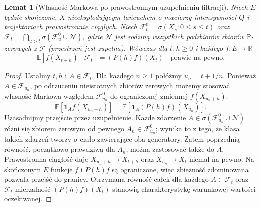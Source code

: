 \documentclass[11pt,a4paper,oneside]{report}
\numberwithin{equation}{chapter}
\theoremstyle{plain}
\newtheorem{lemat}[twierdzenie]{Lemat}
\theoremstyle{definition}
\theoremstyle{remark}
\newcommand{\R}{\mathbb{R}}
\newcommand{\Prob}{\mathbb{P}}
\newcommand{\E}{\mathbb{E}}
\newcommand{\calF}{\mathcal{F}}
\newcommand{\calN}{\mathcal{N}}
\newcommand{\ind}[1]{\mathbf{1}_{#1}}
\begin{document}
\begin{lemat}[Własność Markowa po prawostronnym uzupełnieniu filtracji]
\label{lem:markov-aug}
Niech $E$ będzie skończone, $X$ nieeksplodującym łańcuchem
o macierzy intensywności $Q$ i trajektoriach prawostronnie
ciągłych. Niech $\calF_t^0=\sigma(X_s:0\le s\le t)$
oraz
$\calF_t=\bigcap_{u>t}\sigma(\calF_u^0\cup\calN)$,
gdzie $\calN$ jest rodziną wszystkich podzbiorów zbiorów
$\Prob$-zerowych z $\calF$ (przestrzeń jest zupełna).
Wówczas dla $t,h\ge0$ i każdego $f:E\to\R$
\[
\E[f(X_{t+h})\mid\calF_t]=(P(h)f)(X_t)
\quad\text{prawie na pewno}.
\]
\end{lemat}
\begin{proof}
Ustalmy $t,h$ i $A\in\calF_t$. Dla każdego $n\ge1$
połóżmy $u_n=t+1/n$. Ponieważ $A\in\calF_{u_n}$,
po odrzuceniu nieistotnych zbiorów zerowych możemy
stosować własność Markowa względem $\calF_{u_n}^0$
do ograniczonej zmiennej $f(X_{u_n+h})$:
\[
\E[\ind A f(X_{u_n+h})]
 =\E[\ind A(P(h)f)(X_{u_n})].
\]
Uzasadnijmy przejście przez uzupełnienie. Każde zdarzenie
$A\in\sigma(\calF_{u_n}^0\cup\calN)$ różni się
zbiorem zerowym od pewnego $A_n\in\calF_{u_n}^0$;
wynika to z tego, że klasa takich zdarzeń tworzy
$\sigma$-ciało zawierające oba generatory. Zatem
poprzednią równość, początkowo prawdziwą dla $A_n$,
można zastosować także do $A$.
Prawostronna ciągłość daje $X_{u_n+h}\to X_{t+h}$
oraz $X_{u_n}\to X_t$ niemal na pewno.
Na skończonym $E$ funkcje $f$ i $P(h)f$ są ograniczone,
więc zbieżność zdominowana pozwala przejść do granicy.
Otrzymana równość całek dla każdego $A\in\calF_t$
oraz $\calF_t$-mierzalność $(P(h)f)(X_t)$
stanowią charakterystykę warunkowej wartości oczekiwanej.
\end{proof}
\end{document}
